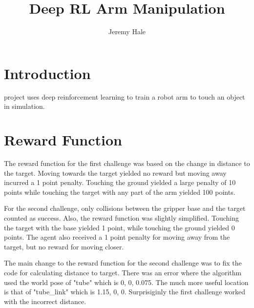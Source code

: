 \documentclass[10pt,journal,compsoc]{IEEEtran}
\begin{document}
\title{Deep RL Arm Manipulation}

\author{Jeremy Hale}

%
{}

\maketitle
\IEEEdisplaynontitleabstractindextext
\IEEEpeerreviewmaketitle
\section{Introduction}
\label{sec:introduction}

 project uses deep reinforcement learning to train a robot arm to touch an object in simulation.

\section{Reward Function}
The reward function for the first challenge was based on the change in distance to the target. Moving towards the target yielded no reward but moving away incurred a 1 point penalty. Touching the ground yielded a large penalty of 10 points while touching the target with any part of the arm yielded 100 points.

For the second challenge, only collisions between the gripper base and the target counted as success. Also, the reward function was slightly simplified. Touching the target with the base yielded 1 point, while touching the ground yielded 0 points. The agent also received a 1 point penalty for moving away from the target, but no reward for moving closer.

The main change to the reward function for the second challenge was to fix the code for calculating distance to target. There was an error where the algorithm used the world pose of "tube" which is 0, 0, 0.075. The much more useful location is that of "tube\_link" which is 1.15, 0, 0. Surprisiginly the first challenge worked with the incorrect distance.
\end{document}
